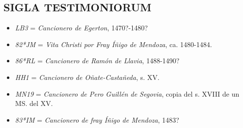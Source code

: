\documentclass[11pt,a4paper,twoside]{article}
\begin{document}
\subsection*{\fontsize{9.5}{12}\selectfont SIGLA TESTIMONIORUM}
\vspace*{-2.5pt}
\begin{itemize}[label=,leftmargin=0.6cm]%
\item \textit{LB3} = \textit{Cancionero de Egerton}, 1470?-1480?
\item \textit{82*JM} = \textit{Vita Christi por Fray Íñigo de Mendoza}, ca. 1480-1484.
\item \textit{86*RL} = \textit{Cancionero de Ramón de Llavia}, 1488-1490?
\item \textit{HH1} = \textit{Cancionero de Oñate-Castañeda}, s. XV.
\item \textit{MN19} = \textit{Cancionero de Pero Guillén de Segovia}, copia del s. XVIII de un MS. del XV.
\item \textit{83*IM} = \textit{Cancionero de fray Íñigo de Mendoza}, 1483?%
\end{itemize}
\end{document}
